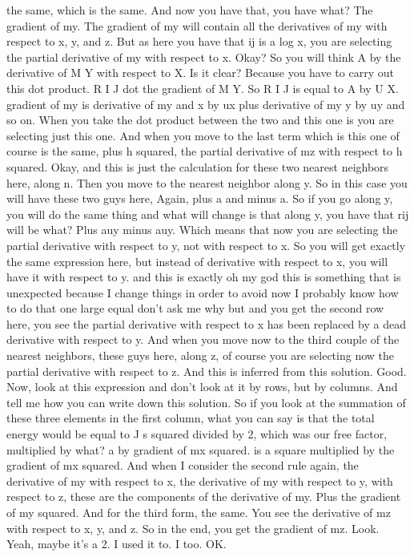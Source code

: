 the same, which is the same. And now you have that, you have what? The gradient of my. The gradient of my will contain all the derivatives of my with respect to x, y, and z. But as here you have that ij is a log x, you are selecting the partial derivative of my with respect to x. Okay? So you will think A by the derivative of M Y with respect to X. Is it clear? Because you have to carry out this dot product. R I J dot the gradient of M Y. So R I J is equal to A by U X. gradient of my is derivative of my and x by ux plus derivative of my y by uy and so on. When you take the dot product between the two and this one is you are selecting just this one. And when you move to the last term which is this one of course is the same, plus h squared, the partial derivative of mz with respect to h squared. Okay, and this is just the calculation for these two nearest neighbors here, along n. Then you move to the nearest neighbor along y. So in this case you will have these two guys here, Again, plus a and minus a. So if you go along y, you will do the same thing and what will change is that along y, you have that rij will be what? Plus auy minus auy. Which means that now you are selecting the partial derivative with respect to y, not with respect to x. So you will get exactly the same expression here, but instead of derivative with respect to x, you will have it with respect to y. and this is exactly oh my god this is something that is unexpected because I change things in order to avoid now I probably know how to do that one large equal don't ask me why but and you get the second row here, you see the partial derivative with respect to x has been replaced by a dead derivative with respect to y. And when you move now to the third couple of the nearest neighbors, these guys here, along z, of course you are selecting now the partial derivative with respect to z. And this is inferred from this solution. Good. Now, look at this expression and don't look at it by rows, but by columns. And tell me how you can write down this solution. So if you look at the summation of these three elements in the first column, what you can say is that the total energy would be equal to J s squared divided by 2, which was our free factor, multiplied by what? a by gradient of mx squared. is a square multiplied by the gradient of mx squared. And when I consider the second rule again, the derivative of my with respect to x, the derivative of my with respect to y, with respect to z, these are the components of the derivative of my. Plus the gradient of my squared. And for the third form, the same. You see the derivative of mz with respect to x, y, and z. So in the end, you get the gradient of mz. Look. Yeah, maybe it's a 2. I used it to. I too. OK.
